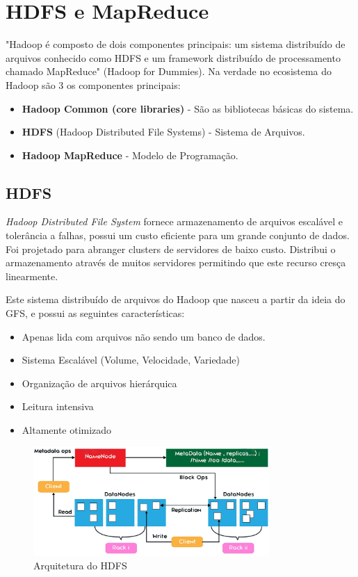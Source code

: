 \documentclass[a4paper,11pt]{article}
\begin{document}
\section{HDFS e MapReduce}
"Hadoop é composto de dois componentes principais: um sistema distribuído de arquivos conhecido como HDFS e um framework distribuído de processamento chamado MapReduce" (Hadoop for Dummies). Na verdade no ecosistema do Hadoop são 3 os componentes principais: \vspace{-1em}
\begin{itemize}
	\item \textbf{Hadoop Common (core libraries)} - São as bibliotecas básicas do sistema.
	\item \textbf{HDFS} (Hadoop Distributed File Systems) - Sistema de Arquivos.
	\item \textbf{Hadoop MapReduce} - Modelo de Programação.
\end{itemize}

\subsection{HDFS}
\textit{Hadoop Distributed File System} fornece armazenamento de arquivos escalável e tolerância a falhas, possui um custo eficiente para um grande conjunto de dados. Foi projetado para abranger clusters de servidores de baixo custo. Distribui o armazenamento através de muitos servidores permitindo que este recurso cresça linearmente.

Este sistema distribuído de arquivos do Hadoop que nasceu a partir da ideia do GFS, e possui as seguintes características: \vspace{-1em}
\begin{itemize}
	\item Apenas lida com arquivos não sendo um banco de dados.
	\item Sistema Escalável (Volume, Velocidade, Variedade)
	\item Organização de arquivos hierárquica
	\item Leitura intensiva
	\item Altamente otimizado
\end{itemize}
\begin{figure}[H]
	\centering
	\includegraphics[width=0.8\textwidth]{imgHadoop/hdfs.png}
	\caption{Arquitetura do HDFS}
\end{figure}
\end{document}
